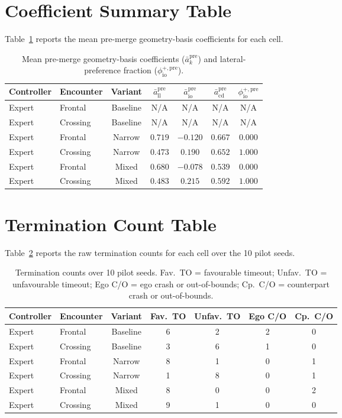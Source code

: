 \documentclass[drones,article,submit,pdftex,moreauthors]{Definitions/mdpi}
\begin{document}
\section{Coefficient Summary Table}

Table~\ref{tab:coefficient_summary} reports the mean pre-merge geometry-basis coefficients for each cell.
\begin{table}[H]
\centering
\caption{Mean pre-merge geometry-basis coefficients ($\bar{a}_{k}^{\mathrm{pre}}$) and lateral-preference fraction ($\phi_{\mathrm{io}}^{+,\mathrm{pre}}$).}
\label{tab:coefficient_summary}
\begin{tabular}{@{}llccccc@{}}
\toprule
Controller & Encounter & Variant & $\bar{a}_{\mathrm{ll}}^{\mathrm{pre}}$ & $\bar{a}_{\mathrm{io}}^{\mathrm{pre}}$ & $\bar{a}_{\mathrm{cd}}^{\mathrm{pre}}$ & $\phi_{\mathrm{io}}^{+,\mathrm{pre}}$ \\
\midrule
Expert & Frontal & Baseline & N/A & N/A & N/A & N/A \\
Expert & Crossing & Baseline & N/A & N/A & N/A & N/A \\
Expert & Frontal & Narrow & $0.719$ & $-0.120$ & $0.667$ & $0.000$ \\
Expert & Crossing & Narrow & $0.473$ & $0.190$ & $0.652$ & $1.000$ \\
Expert & Frontal & Mixed & $0.680$ & $-0.078$ & $0.539$ & $0.000$ \\
Expert & Crossing & Mixed & $0.483$ & $0.215$ & $0.592$ & $1.000$ \\
\bottomrule
\end{tabular}
\end{table}


\section{Termination Count Table}

Table~\ref{tab:termination_counts} reports the raw termination counts for each cell over the 10 pilot seeds.
\begin{table}[H]
\centering
\caption{Termination counts over 10 pilot seeds. Fav.~TO = favourable timeout; Unfav.~TO = unfavourable timeout; Ego C/O = ego crash or out-of-bounds; Cp.~C/O = counterpart crash or out-of-bounds.}
\label{tab:termination_counts}
\begin{tabular}{@{}llccccc@{}}
\toprule
Controller & Encounter & Variant & Fav.~TO & Unfav.~TO & Ego C/O & Cp.~C/O \\
\midrule
Expert & Frontal & Baseline & 6 & 2 & 2 & 0 \\
Expert & Crossing & Baseline & 3 & 6 & 1 & 0 \\
Expert & Frontal & Narrow & 8 & 1 & 0 & 1 \\
Expert & Crossing & Narrow & 1 & 8 & 0 & 1 \\
Expert & Frontal & Mixed & 8 & 0 & 0 & 2 \\
Expert & Crossing & Mixed & 9 & 1 & 0 & 0 \\
\bottomrule
\end{tabular}
\end{table}
\end{document}
